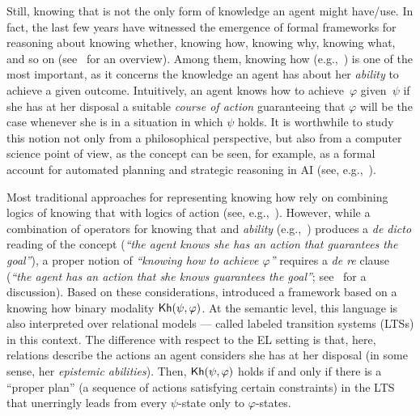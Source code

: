 Still, knowing that is not the only form of knowledge an agent might have/use. In fact, the last few years have witnessed the emergence of formal frameworks for reasoning about knowing whether, knowing how, knowing why, knowing what, and so on (see~\cite{Wang16} for an overview). Among them, knowing how (e.g.,~\cite{Pavese22}) is one of the most important, as it concerns the knowledge an agent has about her \emph{ability} to achieve a given outcome. Intuitively, an agent knows how to achieve~$\varphi$ given~$\psi$ if she has at her disposal a suitable \emph{course of action} guaranteeing that $\varphi$ will be the case whenever she is in a situation in which $\psi$ holds. It is worthwhile to study  this notion not only from a philosophical perspective, but also from a computer science point of view, as the concept can be seen, for example, as a formal account for automated planning and strategic reasoning in AI (see, e.g.,~\cite{KandA15}).

Most traditional approaches for representing knowing how rely on combining logics of knowing that with logics of action (see, e.g.,~\cite{Mccarthy69,Les00,HerzigT06}). However, while a combination of operators for knowing that and \emph{ability} (e.g.,~\cite{wiebeetal:2003}) produces a \emph{de dicto} reading of the concept (\emph{``the agent knows she has an action that guarantees the goal''}), a proper notion of \emph{``knowing how to achieve $\varphi$''} requires a \emph{de re} clause (\emph{``the agent has an action that she knows guarantees the goal''}; see~\cite{JamrogaA07,Herzig15} for a discussion). Based on these considerations, \cite{Wang15lori,Wang2016} introduced a framework based on a knowing how binary modality ${\sf Kh}(\psi,\varphi)$. At the semantic level, this language is also interpreted over relational models --- called labeled transition systems (LTSs) in this context. The difference with respect to the EL setting is that, here, relations describe the actions an agent considers she has at her disposal (in some sense, her \emph{epistemic abilities}).
Then, ${\sf Kh}(\psi,\varphi)$ holds if and only if there is a ``proper plan'' (a sequence of actions satisfying certain constraints) in the LTS that unerringly leads from every $\psi$-state only to $\varphi$-states.


